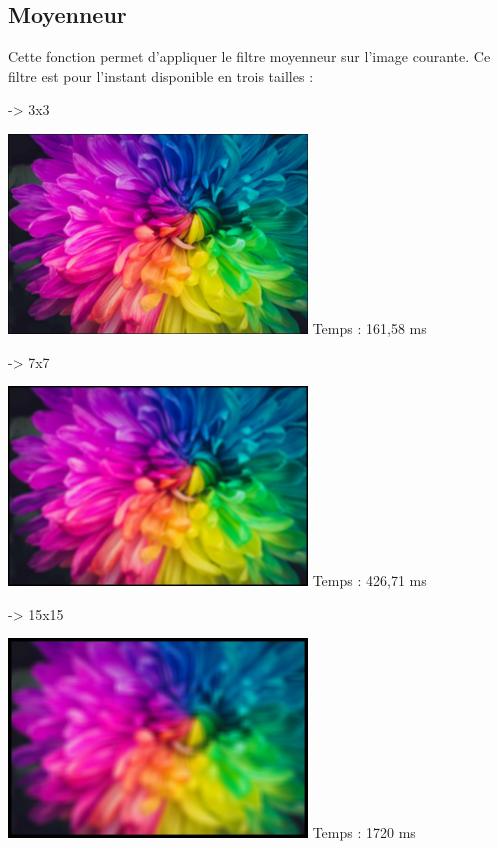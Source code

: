 \documentclass{article}
\begin{document}
\bigbreak
\subsection{Moyenneur}
Cette fonction permet d'appliquer le filtre moyenneur sur l'image courante. Ce filtre est pour l'instant disponible en trois tailles :
\medbreak

-> 3x3
\begin{center}
    \medbreak
    \includegraphics[width=300px]{./Images/Multicolor/Average_3.jpg}
    \bigbreak
    Temps  : 161,58 ms
\end{center}
\medbreak

-> 7x7
\begin{center}
    \medbreak
    \includegraphics[width=300px]{./Images/Multicolor/Average_7.jpg}
    \bigbreak
    Temps  : 426,71 ms
\end{center}
\medbreak

-> 15x15
\begin{center}
    \medbreak
    \includegraphics[width=300px]{./Images/Multicolor/Average_15.jpg}
    \bigbreak
    Temps  : 1720 ms
\end{center}
\bigbreak
\end{document}
